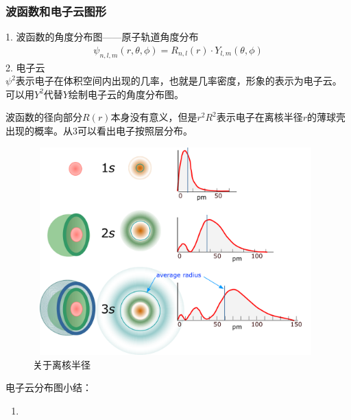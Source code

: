 \documentclass[utf8,a4paper,12pt]{ctexart}
\begin{document}
\subsubsection{波函数和电子云图形}
1. 波函数的角度分布图——原子轨道角度分布
\begin{align*}
\psi_{n,l,m}(r,\theta,\phi) = R_{n,l}(r) \cdot Y_{l,m}(\theta,\phi)
\end{align*}
2. 电子云\\
$\psi^2$表示电子在体积空间内出现的几率，也就是几率密度，形象的表示为电子云。\\
可以用$Y^2$代替$Y$绘制电子云的角度分布图。

波函数的径向部分$R(r)$本身没有意义，但是$r^2R^2$表示电子在离核半径$r$的薄球壳出现的概率。从\figurename{3}可以看出电子按照层分布。

\begin{figure}[H]
\centering
\includegraphics[width=11cm,height=8cm]{s-orb_shells.png}
\caption{关于离核半径}
\end{figure}
电子云分布图小结：\\
\begin{enumerate}
\item 
\end{enumerate}
\end{document}
